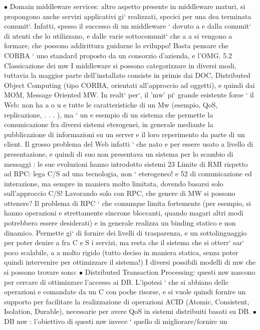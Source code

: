 \documentclass[a4paper,12pt]{article}
\begin{document}
$\bullet$ Domain middleware services: altro aspetto presente in middleware maturi,
si propongono anche servizi applicativi gi` realizzati, specici per una dea
terminata comunit`. Infatti, spesso il successo di un middleware ` dovuto
a
e
dalla comunit` di utenti che lo utilizzano, e dalle varie sottocomunit` che
a
a
si vengono a formare, che possono addirittura guidarne lo sviluppo! Basta
pensare che CORBA ` uno standard proposto da un consorzio d'azienda,
e
l'OMG.
5.2
Classicazione dei mw
I middleware si possono categorizzare in diversi modi, tuttavia la maggior parte
dell'installato consiste in primis dai DOC, Distributed Object Computing (tipo
CORBA, orientati all'approccio ad oggetti), e quindi dai MOM, Message Oriented MW. In realt` per`, il 'mw' pi` grande
esistente forse ` il Web: non ha
a
o
u
e
tutte le caratteristiche di un Mw (esempio, QoS, replicazione, . . . ), ma ` un
e
esempio di un sistema che permette la comunicazione fra diversi sistemi eterogenei, in generale mediante la
pubblicazione di informazioni su un server e il loro
reperimento da parte di un client. Il grosso problema del Web infatti ` che nato
e
per essere usato a livello di presentazione, e quindi di suo non presentava un
sistema per lo scambio di messaggi : le sue evoluzioni hanno introdotto sistemi
23 Limite
di RMI rispetto ad RPC: lega C/S ad una tecnologia, non ` eterogeneo!
e
52
\newpage
di comunicazione ed interazione, ma sempre in maniera molto limitata, dovendo
basarsi solo sull'approccio C/S!
Lavorando solo con RPC, che genere di MW si possono ottenere? Il problema
di RPC ` che comunque limita fortemente (per esempio, si hanno operazioni
e
strettamente sincrone bloccanti, quando magari altri modi potrebbero essere
desiderati) e in generale realizza un binding statico e non dinamico. Permette
gi` di fornire dei livelli di trasparenza, e un sottolinguaggio per poter denire
a
fra C e S i servizi, ma resta che il sistema che si otterr` sar` poco scalabile,
a
a
molto rigido (tutto deciso in maniera statica, senza poter quindi intervenire per
ottimizzare il sistema!)
I diversi possibili modelli di mw che si possono trovare sono:
$\bullet$ Distributed Transaction Processing: questi mw nascono per cercare di
ottimizzare l'accesso ai DB. L'ipotesi ` che si abbiano delle operazioni
e
comandate da un C con poche risorse, e si vuole quindi fornire un supporto
per facilitare la realizzazione di operazioni ACID (Atomic, Consistent,
Isolation, Durable), necessarie per avere QoS in sistemi distribuiti basati
su DB.
$\bullet$ DB mw : l'obiettivo di questi mw invece ` quello di migliorare/fornire un
\end{document}

